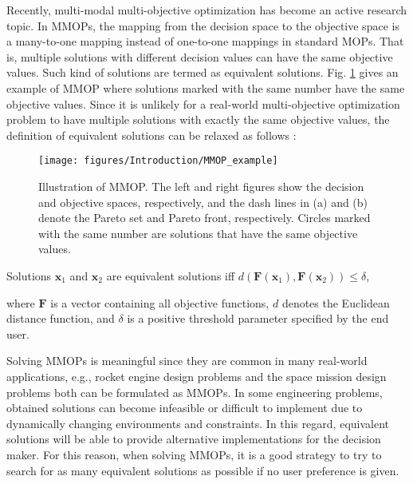 Recently, multi-modal multi-objective optimization has become an active research topic. In MMOPs, the mapping from the decision space to the objective space is a many-to-one mapping instead of one-to-one mappings in standard MOPs. That is, multiple solutions with different decision values can have the same objective values. Such kind of solutions are termed as equivalent solutions. Fig. \ref{fig: MMOP example} gives an example of MMOP where solutions marked with the same number have the same objective values. Since it is unlikely for a real-world multi-objective optimization problem to have multiple solutions with exactly the same objective values, the definition of equivalent solutions can be relaxed as follows \cite{tanabe2020review}: 

\begin{figure}[htbp]
	\centering
	\texttt{[image: figures/Introduction/MMOP\_example]}
	\caption{Illustration of MMOP. The left and right figures show the decision and objective spaces, respectively, and the dash lines in (a) and (b) denote the Pareto set and Pareto front, respectively. Circles marked with the same number are solutions that have the same objective values.}
	\label{fig: MMOP example}
\end{figure}

\begin{definition}
	Solutions $\boldsymbol{x}_1$ and $\boldsymbol{x}_2$ are equivalent solutions iff $d(\boldsymbol{F}(\boldsymbol{x}_1),\boldsymbol{F}(\boldsymbol{x}_2)) \leq \delta$,
	\label{def: equivalent solutions}
\end{definition}
where $\boldsymbol{F}$ is a vector containing all objective functions, $d$ denotes the Euclidean distance function, and $\delta$ is a positive threshold parameter specified by the end user.

Solving MMOPs is meaningful since they are common in many real-world applications, e.g., rocket engine design problems \cite{MMOP_rocket} and the space mission design problems \cite{space-mission-design} both can be formulated as MMOPs. In some engineering problems, obtained solutions can become infeasible or difficult to implement due to dynamically changing environments and constraints\cite{MMOEADC}. In this regard, equivalent solutions will be able to provide alternative implementations for the decision maker. For this reason, when solving MMOPs, it is a good strategy to try to search for as many equivalent solutions as possible if no user preference is given.

